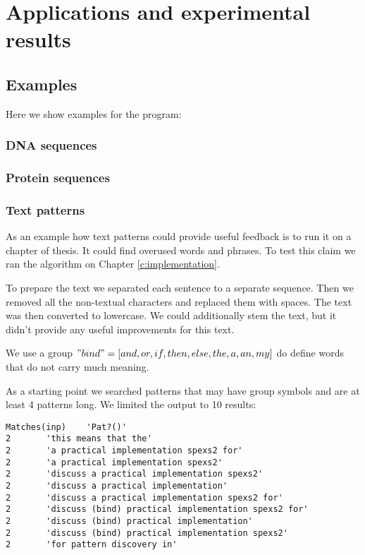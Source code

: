 \chapter{Applications and experimental results}
\label{c:results}

\WIP

\section{Examples}

Here we show examples for the program:

\subsection{DNA sequences}


\subsection{Protein sequences}


\subsection{Text patterns}

As an example how text patterns could provide useful feedback is to run it on a chapter of thesis. It could find overused words and phrases. To test this claim we ran the algorithm on Chapter \ref{c:implementation}.

To prepare the text we separated each sentence to a separate sequence. Then we removed all the non-textual characters and replaced them with spaces. The text was then converted to lowercase. We could additionally stem the text, but it didn't provide any useful improvements for this text.

We use a group $"bind" = [and, or, if, then, else, the, a, an, my]$ do define words that do not carry much meaning.

As a starting point we searched patterns that may have group symbols and are at least 4 patterns long. We limited the output to 10 results:

\begin{Verbatim}
Matches(inp)    'Pat?()'
2       'this means that the'
2       'a practical implementation spexs2 for'
2       'a practical implementation spexs2'
2       'discuss a practical implementation spexs2'
2       'discuss a practical implementation'
2       'discuss a practical implementation spexs2 for'
2       'discuss (bind) practical implementation spexs2 for'
2       'discuss (bind) practical implementation'
2       'discuss (bind) practical implementation spexs2'
2       'for pattern discovery in'
\end{Verbatim}

